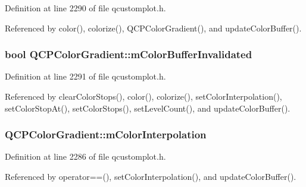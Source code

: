 Definition at line 2290 of file qcustomplot.\+h.



Referenced by color(), colorize(), Q\+C\+P\+Color\+Gradient(), and update\+Color\+Buffer().

\hypertarget{class_q_c_p_color_gradient_abacf55e11f67d6722a687af1bb2687bd}{}
\subsubsection[{m\+Color\+Buffer\+Invalidated}]{\setlength{\rightskip}{0pt plus 5cm}bool Q\+C\+P\+Color\+Gradient\+::m\+Color\+Buffer\+Invalidated\hspace{0.3cm}{\ttfamily [protected]}}\label{class_q_c_p_color_gradient_abacf55e11f67d6722a687af1bb2687bd}


Definition at line 2291 of file qcustomplot.\+h.



Referenced by clear\+Color\+Stops(), color(), colorize(), set\+Color\+Interpolation(), set\+Color\+Stop\+At(), set\+Color\+Stops(), set\+Level\+Count(), and update\+Color\+Buffer().

\hypertarget{class_q_c_p_color_gradient_a028cef73d863800a9ee93ffd641cce01}{}
\subsubsection[{m\+Color\+Interpolation}]{ Q\+C\+P\+Color\+Gradient\+::m\+Color\+Interpolation\hspace{0.3cm}{\ttfamily [protected]}}\label{class_q_c_p_color_gradient_a028cef73d863800a9ee93ffd641cce01}


Definition at line 2286 of file qcustomplot.\+h.



Referenced by operator==(), set\+Color\+Interpolation(), and update\+Color\+Buffer().

\hypertarget{class_q_c_p_color_gradient_a9e11a2b0974ef289d12c324822bc3a3e}{}
